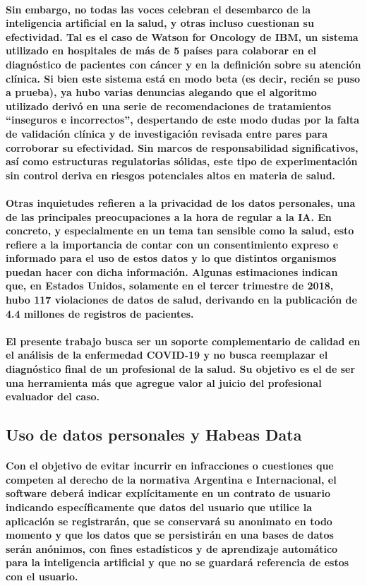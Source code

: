 \documentclass[a4paper,11pt,twocolumn]{article}
\begin{document}
\paragraph{Sin embargo, no todas las voces celebran el desembarco de la inteligencia artificial en la salud, y otras incluso cuestionan su efectividad. Tal es el caso de Watson for Oncology de IBM, un sistema utilizado en hospitales de más de 5 países para colaborar en el diagnóstico de pacientes con cáncer y en la definición sobre su atención clínica. Si bien este sistema está en modo beta (es decir, recién se puso a prueba), ya hubo varias denuncias alegando que el algoritmo utilizado derivó en una serie de recomendaciones de tratamientos “inseguros e incorrectos”, despertando de este modo dudas por la falta de validación clínica y de investigación revisada entre pares para corroborar su efectividad. Sin marcos de responsabilidad significativos, así como estructuras regulatorias sólidas, este tipo de experimentación sin control deriva en riesgos potenciales altos en materia de salud.}
\paragraph{Otras inquietudes refieren a la privacidad de los datos personales, una de las principales preocupaciones a la hora de regular a la IA. En concreto, y especialmente en un tema tan sensible como la salud, esto refiere a la importancia de contar con un consentimiento expreso e informado para el uso de estos datos y lo que distintos organismos puedan hacer con dicha información. Algunas estimaciones indican que, en Estados Unidos, solamente en el tercer trimestre de 2018, hubo 117 violaciones de datos de salud, derivando en la publicación de 4.4 millones de registros de pacientes\cite{inteligencia-artificial-en-salud}.}
\paragraph{El presente trabajo busca ser un soporte complementario de calidad en el análisis de la enfermedad COVID-19 y no busca reemplazar el diagnóstico final de un profesional de la salud. Su objetivo es el de ser una herramienta más que agregue valor al juicio del profesional evaluador del caso.}
\subsection{Uso de datos personales y Habeas Data}
\paragraph{Con el objetivo de evitar incurrir en infracciones o cuestiones que competen al derecho de la normativa Argentina e Internacional, el software deberá indicar explícitamente en un contrato de usuario indicando específicamente que datos del usuario que utilice la aplicación se registrarán, que se conservará su anonimato en todo momento y que los datos que se persistirán en una bases de datos serán anónimos, con fines estadísticos y de aprendizaje automático para la inteligencia artificial y que no se guardará referencia de estos con el usuario.}
\end{document}
